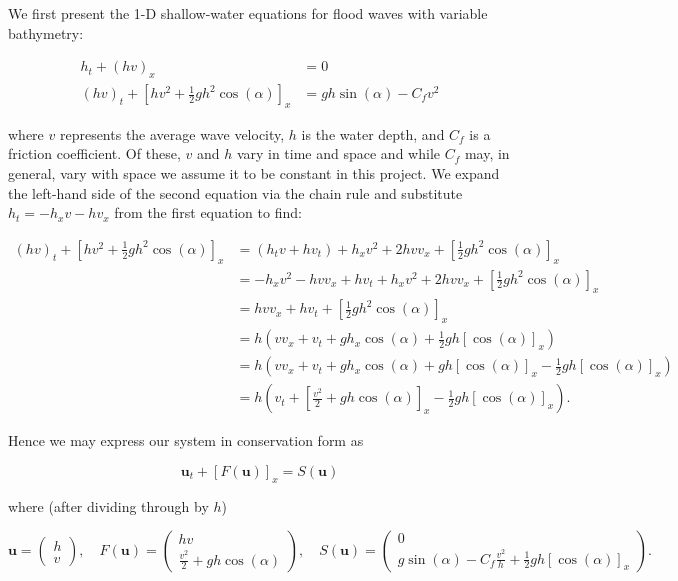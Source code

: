 We first present the 1-D shallow-water equations for flood waves with variable bathymetry\cite{whitham1999_ch3}:

\begin{align*}
    h_t + (h v)_x &= 0 \\
    (h v)_t + \left[ hv^2 + \frac{1}{2} g h^2 \cos{(\alpha)} \right]_x &= g h \sin{(\alpha)} - C_f v^2
\end{align*}

where $v$ represents the average wave velocity, $h$ is the water depth, and $C_f$ is a friction
coefficient. Of these, $v$ and $h$ vary in time and space and while $C_f$ may, in general, vary with space we assume
it to be constant in this project. We expand the left-hand side of the second equation via the chain rule and 
substitute $h_t = -h_x v - h v_x$ from the first equation to find: 

\begin{align*}
    (h v)_t + \left[ hv^2 + \frac{1}{2} g h^2 \cos{(\alpha)} \right]_x 
        &= \left( h_t v + h v_t \right) + h_x v^2 + 2 h v v_x + \left[ \frac{1}{2} g h^2 \cos{(\alpha)} \right]_x \\
        &= -h_x v^2 - h v v_x + h v_t + h_x v^2 + 2 h v v_x + \left[ \frac{1}{2} g h^2 \cos{(\alpha)} \right]_x \\
        &=  h v v_x + h v_t + \left[ \frac{1}{2} g h^2 \cos{(\alpha)} \right]_x \\
        &=  h \left( v v_x + v_t + g h_x \cos{(\alpha)} + \frac{1}{2} g h [\cos{(\alpha)}]_x \right) \\
        &=  h \left( v v_x + v_t + g h_x \cos{(\alpha)} + g h [\cos{(\alpha)}]_x - \frac{1}{2} g h [\cos{(\alpha)}]_x \right) \\
        &=  h \left( v_t + \left[ \frac{v^2}{2} + g h \cos{(\alpha)} \right]_x - \frac{1}{2} g h [\cos{(\alpha)}]_x \right).
\end{align*}

\pagebreak
Hence we may express our system in conservation form as

$$
    \textbf{u}_t + \left[ F(\textbf{u}) \right]_x = S(\textbf{u})
$$

where (after dividing through by $h$)

$$
\textbf{u} = \begin{pmatrix}
    h \\
    v
\end{pmatrix}, \quad F(\textbf{u}) = \begin{pmatrix}
    hv \\
    \frac{v^2}{2} + g h \cos{(\alpha)}
\end{pmatrix}, \quad S(\textbf{u}) = \begin{pmatrix}
    0 \\
    g \sin{(\alpha)} - C_f \frac{v^2}{h} + \frac{1}{2} g h [\cos{(\alpha)}]_x
\end{pmatrix}.
$$

